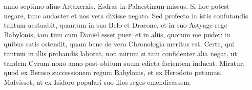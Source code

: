 anno septimo alius Artaxerxis.
Esdras in Palaestinam missus.
Si hoc potest negare, tunc audacter et nos vera dixisse negato.
Sed profecto
in istis confutandis tantum aestuabit, quantum in suo Belo et
Dracone, et in suo Astyage rege Babylonis, iam tum cum Daniel
esset puer: et in aliis, quorum me pudet: in quibus satis ostendit,
quam bene de vera Chronologia meritus est.
Certe, qui tantum in
illis probandis laborat, non mirum si tam confidenter alia negat, ut
tandem Cyrum nono anno post obitum suum edicta facientem inducat.
{}
Miratur, quod ex Beroso successionem regum Babylonis, et
ex Herodoto petamus. Malvisset, ut ex Isidoro populari suo illos
reges emendicassem.

